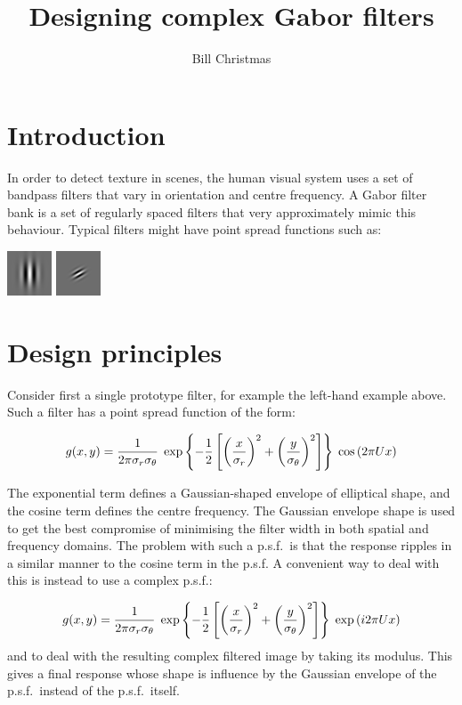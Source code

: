 \documentclass[12pt,a4]{article}
\title{Designing complex Gabor filters}
\author{Bill Christmas}
\begin{document}
\maketitle

\section{Introduction}

In order to detect texture in scenes, the human visual system uses a set of bandpass filters that vary in orientation and centre frequency.  A Gabor filter bank is a set of regularly spaced filters that very approximately mimic this behaviour.  Typical filters might have point spread functions such as:

\begin{center}
  \includegraphics{psf}  \hspace{2cm} \includegraphics{psf45}
\end{center}

\section{Design principles}

Consider first a single prototype filter, for example the left-hand example above.  Such a filter has a point spread function of the form:

\[ g(x,y) = {1 \over 2 \pi  \sigma_r\sigma_\theta}\;
\exp \left\{ -{1\over2} \left[{\left(x\over\sigma_r\right)^2+\left(y \over \sigma_\theta\right)^2}\right]\right\} \;
\cos\left(2\pi U x\right) \]

The exponential term defines a Gaussian-shaped envelope of elliptical shape, and the cosine term defines the centre frequency.  The Gaussian envelope shape is used to get the best compromise of minimising the filter width in both spatial and frequency domains.  The problem with such a p.s.f.\ is that the response ripples in a similar manner to the cosine term in the p.s.f.  A convenient way to deal with this is instead to use a complex p.s.f.:

\[ g(x,y) = {1 \over 2 \pi  \sigma_r\sigma_\theta}\;
\exp \left\{ -{1\over2} \left[{\left(x\over\sigma_r\right)^2+\left(y \over \sigma_\theta\right)^2}\right]\right\} \;
\exp\left(i2\pi U x\right) \]
and to deal with the resulting complex filtered image by taking its modulus.  This gives a final response whose shape is influence by the Gaussian envelope of the p.s.f.\ instead of the p.s.f.\ itself.
\end{document}
